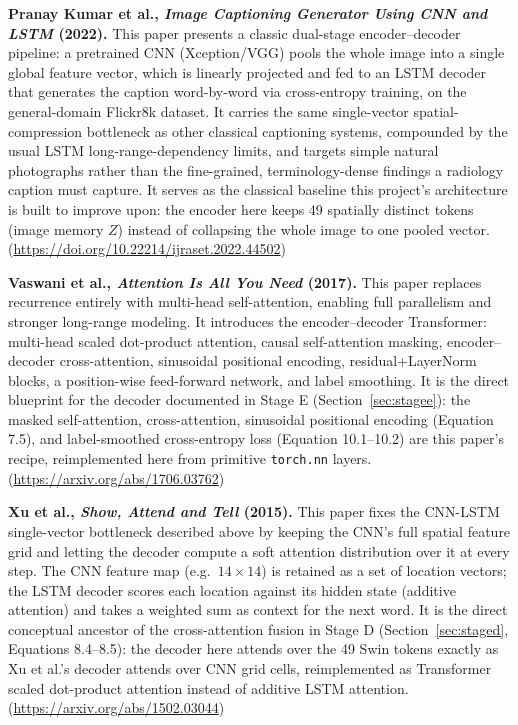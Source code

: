 \documentclass[12pt]{article}
\newcommand{\code}[1]{\texttt{#1}}
\begin{document}
\textbf{Pranay Kumar et al., \emph{Image Captioning Generator Using CNN and LSTM} (2022).} This paper presents a classic dual-stage encoder--decoder pipeline: a pretrained CNN (Xception/VGG) pools the whole image into a single global feature vector, which is linearly projected and fed to an LSTM decoder that generates the caption word-by-word via cross-entropy training, on the general-domain Flickr8k dataset. It carries the same single-vector spatial-compression bottleneck as other classical captioning systems, compounded by the usual LSTM long-range-dependency limits, and targets simple natural photographs rather than the fine-grained, terminology-dense findings a radiology caption must capture. It serves as the classical baseline this project's architecture is built to improve upon: the encoder here keeps 49 spatially distinct tokens (image memory $Z$) instead of collapsing the whole image to one pooled vector. (\url{https://doi.org/10.22214/ijraset.2022.44502})

\textbf{Vaswani et al., \emph{Attention Is All You Need} (2017).} This paper replaces recurrence entirely with multi-head self-attention, enabling full parallelism and stronger long-range modeling. It introduces the encoder--decoder Transformer: multi-head scaled dot-product attention, causal self-attention masking, encoder--decoder cross-attention, sinusoidal positional encoding, residual+LayerNorm blocks, a position-wise feed-forward network, and label smoothing. It is the direct blueprint for the decoder documented in Stage E (Section~\ref{sec:stagee}): the masked self-attention, cross-attention, sinusoidal positional encoding (Equation 7.5), and label-smoothed cross-entropy loss (Equation 10.1--10.2) are this paper's recipe, reimplemented here from primitive \code{torch.nn} layers. (\url{https://arxiv.org/abs/1706.03762})

\textbf{Xu et al., \emph{Show, Attend and Tell} (2015).} This paper fixes the CNN-LSTM single-vector bottleneck described above by keeping the CNN's full spatial feature grid and letting the decoder compute a soft attention distribution over it at every step. The CNN feature map (e.g.\ $14\times14$) is retained as a set of location vectors; the LSTM decoder scores each location against its hidden state (additive attention) and takes a weighted sum as context for the next word. It is the direct conceptual ancestor of the cross-attention fusion in Stage D (Section~\ref{sec:staged}, Equations 8.4--8.5): the decoder here attends over the 49 Swin tokens exactly as Xu et al.'s decoder attends over CNN grid cells, reimplemented as Transformer scaled dot-product attention instead of additive LSTM attention. (\url{https://arxiv.org/abs/1502.03044})
\end{document}
